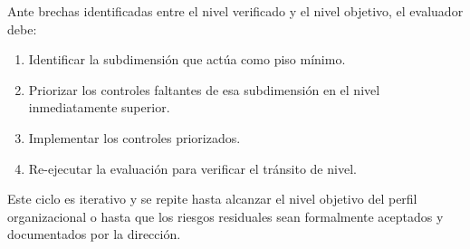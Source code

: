 Ante brechas identificadas entre el nivel verificado y el nivel objetivo, el evaluador debe:

\begin{enumerate}[leftmargin=2em]
  \item Identificar la subdimensión que actúa como piso mínimo.
  \item Priorizar los controles faltantes de esa subdimensión en el nivel inmediatamente superior.
  \item Implementar los controles priorizados.
  \item Re-ejecutar la evaluación para verificar el tránsito de nivel.
\end{enumerate}

Este ciclo es iterativo y se repite hasta alcanzar el nivel objetivo del perfil organizacional o hasta que los riesgos residuales sean formalmente aceptados y documentados por la dirección.